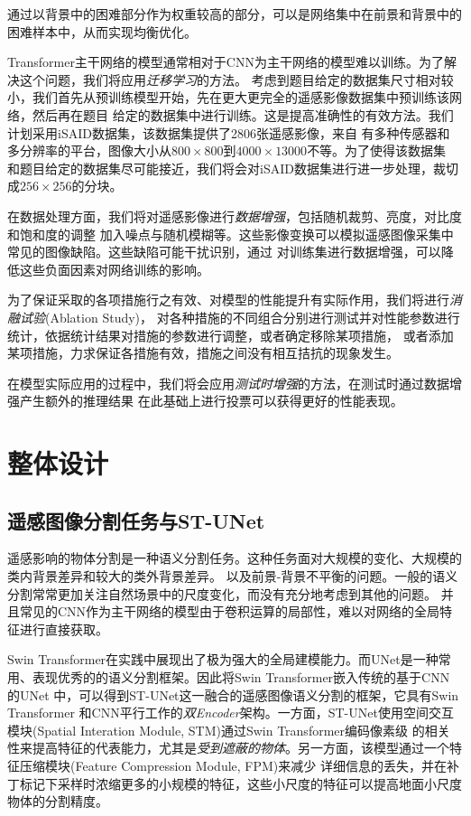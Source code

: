 \documentclass[a4paper,twoside,zihao=5,UTF8]{ctexrep}
\begin{document}
通过以背景中的困难部分作为权重较高的部分，可以是网络集中在前景和背景中的困难样本中，从而实现均衡优化。

Transformer主干网络的模型通常相对于CNN为主干网络的模型难以训练。为了解决这个问题，我们将应用\emph{迁移学习}的方法。
考虑到题目给定的数据集尺寸相对较小，我们首先从预训练模型开始，先在更大更完全的遥感影像数据集中预训练该网络，然后再在题目
给定的数据集中进行训练。这是提高准确性的有效方法。我们计划采用iSAID数据集\cite{isaid}，该数据集提供了2806张遥感影像，来自
有多种传感器和多分辨率的平台，图像大小从$800\times800$到$4000\times13000$不等。为了使得该数据集
和题目给定的数据集尽可能接近，我们将会对iSAID数据集进行进一步处理，裁切成$256\times256$的分块。

在数据处理方面，我们将对遥感影像进行\emph{数据增强}，包括随机裁剪、亮度，对比度和饱和度的调整
加入噪点与随机模糊等。这些影像变换可以模拟遥感图像采集中常见的图像缺陷。这些缺陷可能干扰识别，通过
对训练集进行数据增强，可以降低这些负面因素对网络训练的影响。

为了保证采取的各项措施行之有效、对模型的性能提升有实际作用，我们将进行\emph{消融试验}(Ablation Study)，
对各种措施的不同组合分别进行测试并对性能参数进行统计，依据统计结果对措施的参数进行调整，或者确定移除某项措施，
或者添加某项措施，力求保证各措施有效，措施之间没有相互拮抗的现象发生。

在模型实际应用的过程中，我们将会应用\emph{测试时增强}的方法，在测试时通过数据增强产生额外的推理结果
在此基础上进行投票可以获得更好的性能表现。


\chapter{整体设计}

\section{遥感图像分割任务与ST-UNet}
遥感影响的物体分割是一种语义分割任务。这种任务面对大规模的变化、大规模的类内背景差异和较大的类外背景差异。
以及前景-背景不平衡的问题。一般的语义分割常常更加关注自然场景中的尺度变化，而没有充分地考虑到其他的问题\cite{farseg}。
并且常见的CNN作为主干网络的模型由于卷积运算的局部性，难以对网络的全局特征进行直接获取。

Swin Transformer在实践中展现出了极为强大的全局建模能力。而UNet是一种常用、表现优秀的的语义分割框架。因此将Swin Transformer嵌入传统的基于CNN的UNet
中，可以得到ST-UNet这一融合的遥感图像语义分割的框架\cite{stunet}，它具有Swin Transformer
和CNN平行工作的\emph{双Encoder}架构。一方面，ST-UNet使用空间交互模块(Spatial Interation Module, STM)通过Swin Transformer编码像素级
的相关性来提高特征的代表能力，尤其是\emph{受到遮蔽的物体}。另一方面，该模型通过一个特征压缩模块(Feature Compression Module, FPM)来减少
详细信息的丢失，并在补丁标记下采样时浓缩更多的小规模的特征，这些小尺度的特征可以提高地面小尺度物体的分割精度。
\end{document}
